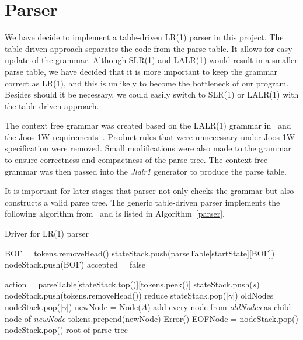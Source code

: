 \section{Parser}

We have decide to implement a table-driven LR(1) parser in this project. The table-driven approach separates the code from the parse table. It allows for easy update of the grammar. Although SLR(1) and LALR(1) would result in a smaller parse table, we have decided that it is more important to keep the grammar correct as LR(1), and this is unlikely to become the bottleneck of our program. Besides should it be necessary, we could easily switch to SLR(1) or LALR(1) with the table-driven approach.

 The context free grammar was created based on the LALR(1) grammar in~\cite{gosling2000java} and the Joos 1W requirements~\cite{joos1w}. Product rules that were unnecessary under Joos 1W specification were removed. Small modifications were also made to the grammar to ensure correctness and compactness of the parse tree. The context free grammar was then passed into the \emph{Jlalr1} generator to produce the parse table.

It is important for later stages that parser not only checks the grammar but also constructs a valid parse tree. The generic table-driven parser implements the following algorithm from~\cite{fischer2009crafting} and is listed in Algorithm~\ref{parser}.
 
\begin{algorithm}                      %
\caption{Driver for LR(1) parser}          %
\label{parser}                           %
\begin{algorithmic}
\State BOF = tokens.removeHead()  
\State stateStack.push(parseTable[startState][BOF])
\State nodeStack.push(BOF)
\State accepted = false

	\State action = parseTable[stateStack.top()][tokens.peek()]
		\State stateStack.push($s$)
		\State nodeStack.push(tokens.removeHead())
		\Comment reduce
		\State stateStack.pop($|\gamma|$)
		\State oldNodes = nodeStack.pop($|\gamma|$)
		\State newNode = Node($A$)
		\State add every node from \emph{oldNodes} as child node of \emph{newNode}
		\State tokens.prepend(newNode)
	\Else 
		\State Error()
	\EndIf
\EndWhile
\State EOFNode = nodeStack.pop()
\State \Return nodeStack.pop()	\Comment root of parse tree

\end{algorithmic}
\end{algorithm}
 
